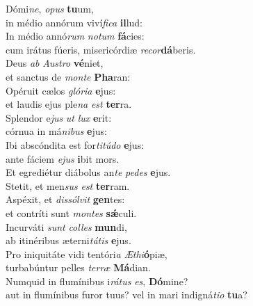 \evenverse Dómi\textit{ne}, \textit{o}\textit{pus} \textbf{tu}um,~\*\\
\evenverse in médio annórum viví\textit{fi}\textit{ca} \textbf{il}lud:\\
\oddverse In médio annó\textit{rum} \textit{no}\textit{tum} \textbf{fá}cies:~\*\\
\oddverse cum irátus fúeris, misericórdiæ \textit{re}\textit{cor}\textbf{dá}beris.\\
\evenverse Deus \textit{ab} \textit{Au}\textit{stro} \textbf{vé}niet,~\*\\
\evenverse et sanctus de \textit{mon}\textit{te} \textbf{Pha}ran:\\
\oddverse Opéruit cælos \textit{gló}\textit{ri}\textit{a} \textbf{e}jus:~\*\\
\oddverse et laudis ejus ple\textit{na} \textit{est} \textbf{ter}ra.\\
\evenverse Splendor e\textit{jus} \textit{ut} \textit{lux} \textbf{e}rit:~\*\\
\evenverse córnua in má\textit{ni}\textit{bus} \textbf{e}jus:\\
\oddverse Ibi abscóndita est for\textit{ti}\textit{tú}\textit{do} \textbf{e}jus:~\*\\
\oddverse ante fáciem \textit{e}\textit{jus} \textbf{i}bit mors.\\
\evenverse Et egrediétur diábolus an\textit{te} \textit{pe}\textit{des} \textbf{e}jus.~\*\\
\evenverse Stetit, et men\textit{sus} \textit{est} \textbf{ter}ram.\\
\oddverse Aspéxit, et \textit{dis}\textit{sól}\textit{vit} \textbf{gen}tes:~\*\\
\oddverse et contríti sunt \textit{mon}\textit{tes} \textbf{sǽ}culi.\\
\evenverse Incurváti \textit{sunt} \textit{col}\textit{les} \textbf{mun}di,~\*\\
\evenverse ab itinéribus æterni\textit{tá}\textit{tis} \textbf{e}jus.\\
\oddverse Pro iniquitáte vidi tentóri\textit{a} \textit{Æ}\textit{thi}\textbf{ó}piæ,~\*\\
\oddverse turbabúntur pelles \textit{ter}\textit{ræ} \textbf{Má}dian.\\
\evenverse Numquid in flumínibus i\textit{rá}\textit{tus} \textit{es}, \textbf{Dó}mine?~\*\\
\evenverse aut in flumínibus furor tuus? vel in mari indigná\textit{ti}\textit{o} \textbf{tu}a?\\
